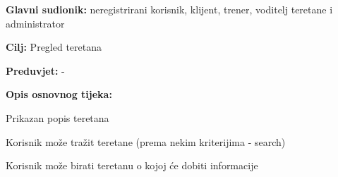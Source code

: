 					\noindent {}
					\begin{packed_item}
	
						\item \textbf{Glavni sudionik: }neregistrirani korisnik, klijent, trener, voditelj teretane i administrator
						\item  \textbf{Cilj:} Pregled teretana
						\item  \textbf{Preduvjet:} -
						\item  \textbf{Opis osnovnog tijeka:}
						
						\item[] \begin{packed_enum}
	
							\item Prikazan popis teretana
							\item Korisnik može tražit teretane (prema nekim kriterijima - search)
							\item Korisnik može birati teretanu o kojoj će dobiti informacije
						\end{packed_enum}
						\end{packed_item}
						
